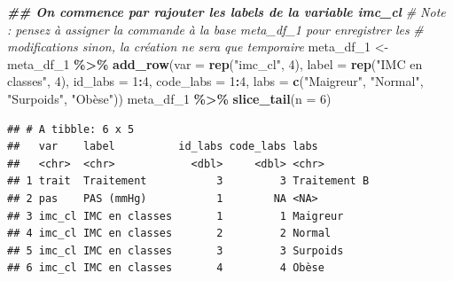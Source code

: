 \documentclass[
]{book}
\newenvironment{Shaded}{\begin{snugshade}}{\end{snugshade}}
\newcommand{\AttributeTok}[1]{\textcolor[rgb]{0.13,0.29,0.53}{#1}}
\newcommand{\CommentTok}[1]{\textcolor[rgb]{0.56,0.35,0.01}{\textit{#1}}}
\newcommand{\DecValTok}[1]{\textcolor[rgb]{0.00,0.00,0.81}{#1}}
\newcommand{\DocumentationTok}[1]{\textcolor[rgb]{0.56,0.35,0.01}{\textbf{\textit{#1}}}}
\newcommand{\FunctionTok}[1]{\textcolor[rgb]{0.13,0.29,0.53}{\textbf{#1}}}
\newcommand{\NormalTok}[1]{#1}
\newcommand{\OtherTok}[1]{\textcolor[rgb]{0.56,0.35,0.01}{#1}}
\newcommand{\SpecialCharTok}[1]{\textcolor[rgb]{0.81,0.36,0.00}{\textbf{#1}}}
\newcommand{\StringTok}[1]{\textcolor[rgb]{0.31,0.60,0.02}{#1}}
\begin{document}
\begin{Shaded}
\begin{Highlighting}[]
\DocumentationTok{\#\# On commence par rajouter les labels de la variable imc\_cl}
\CommentTok{\# Note : pensez à assigner la commande à la base meta\_df\_1 pour enregistrer les }
\CommentTok{\# modifications sinon, la création ne sera que temporaire}
\NormalTok{meta\_df\_1 }\OtherTok{\textless{}{-}}\NormalTok{ meta\_df\_1 }\SpecialCharTok{\%\textgreater{}\%} \FunctionTok{add\_row}\NormalTok{(}\AttributeTok{var =} \FunctionTok{rep}\NormalTok{(}\StringTok{"imc\_cl"}\NormalTok{, }\DecValTok{4}\NormalTok{), }
                                   \AttributeTok{label =} \FunctionTok{rep}\NormalTok{(}\StringTok{"IMC en classes"}\NormalTok{, }\DecValTok{4}\NormalTok{), }
                                   \AttributeTok{id\_labs =} \DecValTok{1}\SpecialCharTok{:}\DecValTok{4}\NormalTok{, }
                                   \AttributeTok{code\_labs =} \DecValTok{1}\SpecialCharTok{:}\DecValTok{4}\NormalTok{,}
                                   \AttributeTok{labs =} \FunctionTok{c}\NormalTok{(}\StringTok{"Maigreur"}\NormalTok{, }\StringTok{"Normal"}\NormalTok{, }\StringTok{"Surpoids"}\NormalTok{, }\StringTok{"Obèse"}\NormalTok{))}
\NormalTok{meta\_df\_1 }\SpecialCharTok{\%\textgreater{}\%} \FunctionTok{slice\_tail}\NormalTok{(}\AttributeTok{n =} \DecValTok{6}\NormalTok{)}
\end{Highlighting}
\end{Shaded}

\begin{verbatim}
## # A tibble: 6 x 5
##   var    label          id_labs code_labs labs        
##   <chr>  <chr>            <dbl>     <dbl> <chr>       
## 1 trait  Traitement           3         3 Traitement B
## 2 pas    PAS (mmHg)           1        NA <NA>        
## 3 imc_cl IMC en classes       1         1 Maigreur    
## 4 imc_cl IMC en classes       2         2 Normal      
## 5 imc_cl IMC en classes       3         3 Surpoids    
## 6 imc_cl IMC en classes       4         4 Obèse
\end{verbatim}
\end{document}
